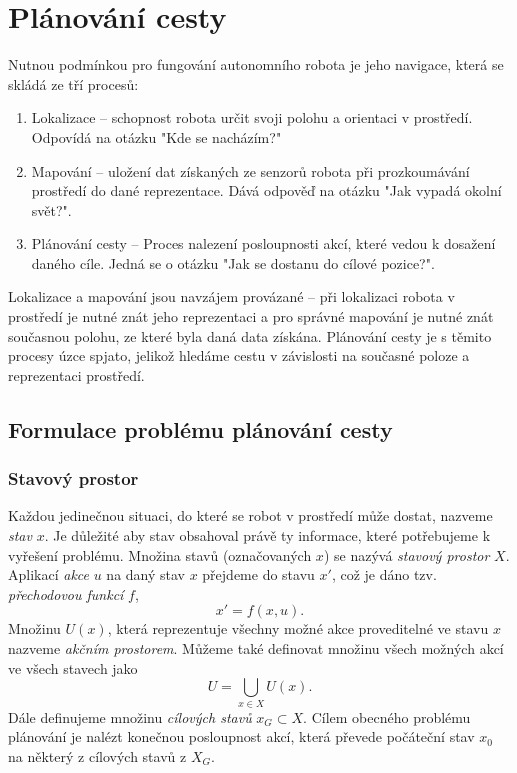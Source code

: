 
\clearpage
\chapter{Plánování cesty}
Nutnou podmínkou pro fungování autonomního robota je jeho navigace, která se skládá ze tří procesů:
\begin{enumerate}
	\item Lokalizace -- schopnost robota určit svoji polohu a orientaci v prostředí. Odpovídá na otázku "Kde se nacházím?"
	\item Mapování -- uložení dat získaných ze senzorů robota při prozkoumávání prostředí do dané reprezentace. Dává odpověď na otázku "Jak vypadá okolní svět?".
	\item Plánování cesty -- Proces nalezení posloupnosti akcí, které vedou k dosažení daného cíle. Jedná se o otázku "Jak se dostanu do cílové pozice?".
\end{enumerate}
Lokalizace a mapování jsou navzájem provázané -- při lokalizaci robota v prostředí je nutné znát jeho reprezentaci a pro správné mapování je nutné znát současnou polohu, ze které byla daná data získána. Plánování cesty je s těmito procesy úzce spjato, jelikož hledáme cestu v závislosti na současné poloze a reprezentaci prostředí. \cite{Meyer2003,Stachniss2009,Koubaa20180406}

\section{Formulace problému plánování cesty}\label{sec:stateSpace}
\subsection{Stavový prostor}
Každou jedinečnou situaci, do které se robot v prostředí může dostat, nazveme \emph{stav} $x$. Je důležité aby stav obsahoval právě ty informace, které potřebujeme k vyřešení problému. Množina stavů (označovaných $x$) se nazývá \emph{stavový prostor} $X$. Aplikací \emph{akce} $u$ na daný stav $x$ přejdeme do stavu $x'$, což je dáno tzv. \emph{přechodovou funkcí} $f$,
\begin{equation}
x'=f\left(x,u\right).
\end{equation}
Množinu $U(x)$, která reprezentuje všechny možné akce proveditelné ve stavu $x$ nazveme \emph{akčním prostorem}. Můžeme také definovat množinu všech možných akcí ve všech stavech jako
\begin{equation}
U=\bigcup_{x \in X} U(x).
\end{equation}
Dále definujeme množinu \emph{cílových stavů} $x_G \subset X$. Cílem obecného problému plánování je nalézt konečnou posloupnost akcí, která převede počáteční stav $x_0$ na některý z cílových stavů z $X_G$. 

